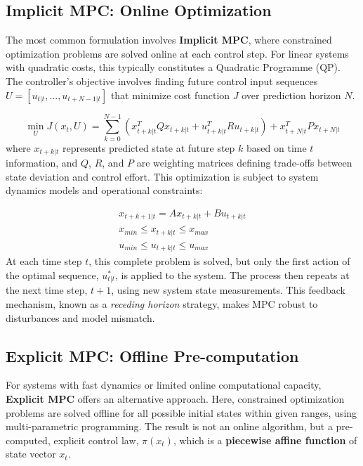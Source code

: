 \subsection{Implicit MPC: Online Optimization}

The most common formulation involves \textbf{Implicit MPC}, where constrained optimization problems are solved online at each control step. For linear systems with quadratic costs, this typically constitutes a Quadratic Programme (QP). The controller's objective involves finding future control input sequences $U = [u_{t|t}, ..., u_{t+N-1|t}]$ that minimize cost function $J$ over prediction horizon $N$.

\begin{equation}
\min_{U} J(x_t, U) = \sum_{k=0}^{N-1} (x_{t+k|t}^T Q x_{t+k|t} + u_{t+k|t}^T R u_{t+k|t}) + x_{t+N|t}^T P x_{t+N|t}
\end{equation}
\noindent
where $x_{t+k|t}$ represents predicted state at future step $k$ based on time $t$ information, and $Q$, $R$, and $P$ are weighting matrices defining trade-offs between state deviation and control effort. This optimization is subject to system dynamics models and operational constraints:

\begin{gather}
    x_{t+k+1|t} = A x_{t+k|t} + B u_{t+k|t} \\
    x_{min} \le x_{t+k|t} \le x_{max} \\
    u_{min} \le u_{t+k|t} \le u_{max}
\end{gather}
\noindent
At each time step $t$, this complete problem is solved, but only the first action of the optimal sequence, $u_{t|t}^*$, is applied to the system. The process then repeats at the next time step, $t+1$, using new system state measurements. This feedback mechanism, known as a \textit{receding horizon} strategy, makes MPC robust to disturbances and model mismatch.

\cite{camacho2013model} \cite{borrelli2017predictive}

\subsection{Explicit MPC: Offline Pre-computation}

For systems with fast dynamics or limited online computational capacity, \textbf{Explicit MPC} offers an alternative approach. Here, constrained optimization problems are solved offline for all possible initial states within given ranges, using multi-parametric programming. The result is not an online algorithm, but a pre-computed, explicit control law, $\pi(x_t)$, which is a \textbf{piecewise affine function} of state vector $x_t$.

